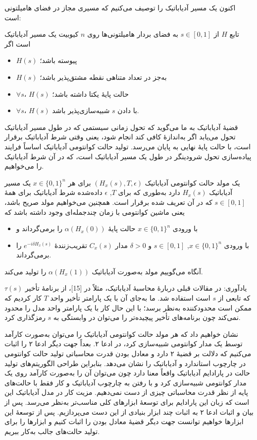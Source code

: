 اکنون یک مسیر آدیاباتیک را توصیف می‌کنیم که مسیری مجاز در فضای هامیلتونی است:
\begin{defn}
تابع $H$ از $s \in [0,1]$ به فضای بردار هامیلتونی‌ها روی $n$ کیوبیت یک مسیر آدیاباتیک است اگر
\begin{itemize}
	\item 
	$H(s)$
	پیوسته باشد؛
	\item
	$H(s)$
	به‌جز در تعداد متناهی نقطه مشتق‌پذیر باشد؛
	\item
	$\forall s$،
	$H(s)$ حالت پایهٔ یکتا داشته باشد؛ 
	\item
	$\forall s$، $H(s)$ با دادن $s$ شبیه‌سازی‌پذیر باشد.
\end{itemize}
\end{defn}
قضیهٔ آدیاباتیک به ما می‌گوید که تحول زمانی سیستمی که در طول مسیر آدیاباتیک تحول می‌یابد اگر به‌اندازهٔ کافی کند انجام شود، یعنی وقتی شرط آدیاباتیک برقرار است، با حالت پایهٔ نهایی به پایان می‌رسد. تولید حالت کوانتومی آدیاباتیک اساساً فرایند پیاده‌سازی تحول شرودینگر در طول یک مسیر آدیاباتیک است، که در آن شرط آدیاباتیک را می‌خواهیم.
\begin{defn}
	یک مولد حالت کوانتومی آدیاباتیک $(H_x(s), T, \epsilon)$ برای هر $x \in \{0,1\}^n$ یک مسیر آدیاباتیک $H_x(s)$ دارد به‌طوری که برای $T$, $\epsilon$ داده‌شده شرط آدیاباتیک برای همهٔ $s \in [0,1]$ که در آن تعریف شده برقرار است. همچنین می‌خواهیم مولد صریح باشد، یعنی ماشین کوانتومی با زمان چندجمله‌ای وجود داشته باشد که 
	\begin{itemize}
		\item 
		با ورودی $x \in \{0,1\}^n$ حالت پایهٔ $\alpha(H_x(0))$ را برمی‌گرداند و
		\item
		با ورودی $x \in \{0,1\}^n$, $s \in [0,1]$ و $\delta > 0$ مدار $C_x(s)$ تقریب‌زنندهٔ $e^{-i\delta H_x(s)}$ را برمی‌گرداند. 
	\end{itemize}
	آنگاه می‌گوییم مولد به‌صورت آدیاباتیک $\alpha(H_x(1))$ را تولید می‌کند.
\end{defn}
یادآوری: در مقالات قبلی دربارهٔ محاسبهٔ آدیاباتیک، مثلاً در [15]، از برنامهٔ تأخیر $\tau(s)$ که تابعی از $s$ است استفاده شد. ما به‌جای آن با یک پارامتر تأخیر واحد $T$ کار کردیم که ممکن است محدودکننده به‌نظر برسد؛ با این حال کار با یک پارامتر واحد مدل را محدود نمی‌کند چون برنامه‌های تأخیر پیچیده‌تر را می‌توان در وابستگی به $s$ رمزگذاری کرد.

نشان خواهیم داد که هر مولد حالت کوانتومی آدیاباتیک را می‌توان به‌صورت کارآمد توسط یک مدار کوانتومی شبیه‌سازی کرد، در ادعا ۲. بعداً جهت دیگر ادعا ۲ را اثبات می‌کنیم که دلالت بر قضیهٔ ۲ دارد و معادل بودن قدرت محاسباتی تولید حالت کوانتومی در چارچوب استاندارد و آدیاباتیک را نشان می‌دهد. بنابراین طراحی الگوریتم‌های تولید حالت در پارادایم آدیاباتیک واقعاً معنا دارد چون می‌توان آن را به‌صورت کارآمد روی یک مدار کوانتومی شبیه‌سازی کرد و با رفتن به چارچوب آدیاباتیک و کار فقط با حالت‌های پایه از نظر قدرت محاسباتی چیزی از دست نمی‌دهیم. مزیت کار در مدل آدیاباتیک این است که زبان این پارادایم برای توسعهٔ ابزارهای کلی مناسب‌تر به‌نظر می‌رسد. پس از بیان و اثبات ادعا ۲ به اثبات چند ابزار بنیادی از این دست می‌پردازیم. پس از توسعهٔ این ابزارها خواهیم توانست جهت دیگر قضیهٔ معادل بودن را اثبات کنیم و ابزارها را برای تولید حالت‌های جالب به‌کار ببریم.

